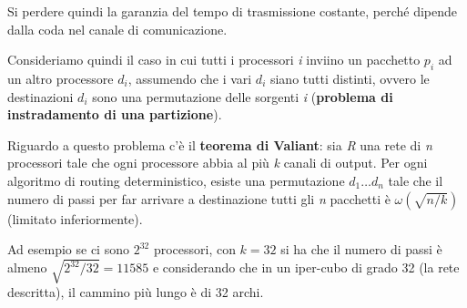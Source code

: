 Si perdere quindi la garanzia del tempo di trasmissione costante, perché dipende dalla coda nel canale di comunicazione.

Consideriamo quindi il caso in cui tutti i processori \emph{i} inviino un pacchetto $p_i$ ad un altro processore $d_i$, assumendo che i vari $d_i$ siano tutti distinti, ovvero le destinazioni $d_i$ sono una permutazione delle sorgenti \emph{i} (\textbf{problema di instradamento di una partizione}).

Riguardo a questo problema c'è il \textbf{teorema di Valiant}: sia \emph{R} una rete di \emph{n} processori tale che ogni processore abbia al più \emph{k} canali di output. 
Per ogni algoritmo di routing deterministico, esiste una permutazione $d_1 \ldots d_n$ tale che il numero di passi per far arrivare a destinazione tutti gli \emph{n} pacchetti è $\omega(\sqrt{n/k})$ (limitato inferiormente).

Ad esempio se ci sono $2^{32}$ processori, con $k = 32$ si ha che il numero di passi è almeno $\sqrt{2^{32} /32} = 11585$ e considerando che in un iper-cubo di grado 32 (la rete descritta), il cammino più lungo è di 32 archi.

